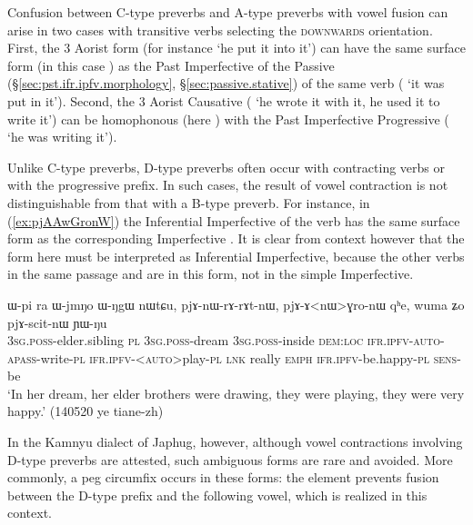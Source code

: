 Confusion between C-type preverbs and A-type preverbs with vowel fusion can arise in two cases with transitive verbs selecting  the \textsc{downwards} orientation. First, the 3\flobv{} Aorist form (for instance  `he put it into it') can have the same surface form (in this case ) as the Past Imperfective of the Passive (§\ref{sec:pst.ifr.ipfv.morphology}, §\ref{sec:passive.stative}) of the same verb ( `it was put in it'). Second, the 3\flobv{} Aorist Causative ( `he wrote it with it, he used it to write it') can be homophonous (here ) with the Past Imperfective  Progressive ( `he was writing it').

Unlike C-type preverbs, D-type preverbs often occur with contracting verbs or with the progressive prefix. In such cases, the result of vowel contraction is not distinguishable from that with a B-type preverb. For instance, in (\ref{ex:pjAAwGronW}) the Inferential Imperfective  of the verb  has the same surface form  as the corresponding Imperfective  . It is clear from context however that the form here must be interpreted as Inferential Imperfective, because the other verbs in the same passage  and  are in this form, not in the simple Imperfective.

\begin{exe}
\ex \label{ex:pjAAwGronW}
 \gll ɯ-pi ra ɯ-jmŋo ɯ-ŋgɯ nɯtɕu, pjɤ-nɯ-rɤ-rɤt-nɯ, pjɤ-ɤ<nɯ>ɣro-nɯ qʰe, wuma ʑo pjɤ-scit-nɯ ɲɯ-ŋu \\
 \textsc{3sg}.\textsc{poss}-elder.sibling \textsc{pl} \textsc{3sg}.\textsc{poss}-dream \textsc{3sg}.\textsc{poss}-inside \textsc{dem}:\textsc{loc} \textsc{ifr}.\textsc{ipfv}-\textsc{auto}-\textsc{apass}-write-\textsc{pl}  \textsc{ifr}.\textsc{ipfv}-<\textsc{auto}>play-\textsc{pl} \textsc{lnk} really \textsc{emph} \textsc{ifr}.\textsc{ipfv}-be.happy-\textsc{pl} \textsc{sens}-be \\
 \glt `In her dream, her elder brothers were drawing, they were playing, they were very happy.' (140520 ye tiane-zh)
\end{exe}

In the Kamnyu dialect of Japhug, however, although vowel contractions involving D-type preverbs are attested, such ambiguous forms are rare and avoided. More commonly, a peg circumfix  occurs in these forms: the  element prevents fusion between the D-type prefix and the following vowel, which is realized  in this context. 

